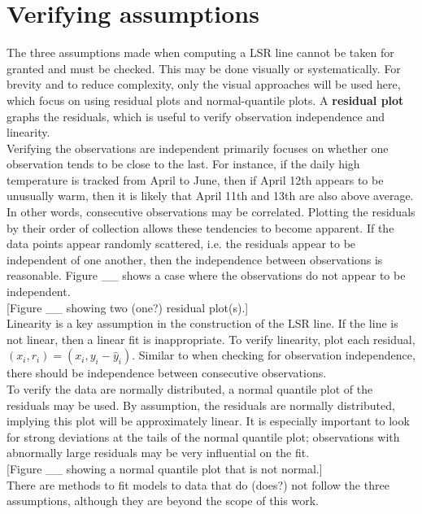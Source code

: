 \section{Verifying assumptions} 

The three assumptions made when computing a LSR line cannot be taken for granted and must be checked. This may be done visually or systematically. For brevity and to reduce complexity, only the visual approaches will be used here, which focus on using residual plots and normal-quantile plots. A \textbf{residual plot} graphs the residuals, which is useful to verify observation independence and linearity. \\

Verifying the observations are independent primarily focuses on whether one observation tends to be close to the last. For instance, if the daily high temperature is tracked from April to June, then if April 12th appears to be unusually warm, then it is likely that April 11th and 13th are also above average. In other words, consecutive observations may be correlated. Plotting the residuals by their order of collection allows these tendencies to become apparent. If the data points appear randomly scattered, i.e. the residuals appear to be independent of one another, then the independence between observations is reasonable. Figure \_\_ shows a case where the observations do not appear to be independent. \\ %

[Figure \_\_ showing two (one?) residual plot(s).] \\

Linearity is a key assumption in the construction of the LSR line. If the line is not linear, then a linear fit is inappropriate. To verify linearity, plot each residual, $(x_i, r_i) = (x_i, y_i - \hat{y}_i)$. Similar to when checking for observation independence, there should be independence between consecutive observations. \\

To verify the data are normally distributed, a normal quantile plot of the residuals may be used. By assumption, the residuals are normally distributed, implying this plot will be approximately linear. It is especially important to look for strong deviations at the tails of the normal quantile plot; observations with abnormally large residuals may be very influential on the fit. \\

[Figure \_\_ showing a normal quantile plot that is not normal.] \\

There are methods to fit models to data that do (does?) not follow the three assumptions, although they are beyond the scope of this work. \\